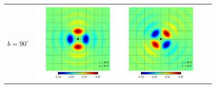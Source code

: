 \documentclass[a4paper,11pt]{article}
\begin{document}
\begin{figure}[!t]
  \begin{center}
  \begin{tabular}{m{8ex}m{}m{}|m{}m{}}
$b=90^\circ$&
\hspace{\kernelfigspace}\includegraphics[width=\kernelfigwidth]{qu2ebqu_rker_D_lat90_lon45.pdf} &
\hspace{\kernelfigspace}\includegraphics[width=\kernelfigwidth]{qu2ebqu_iker_D_lat90_lon45.pdf} &

\end{tabular}
\end{center}
\end{figure}
\end{document}
